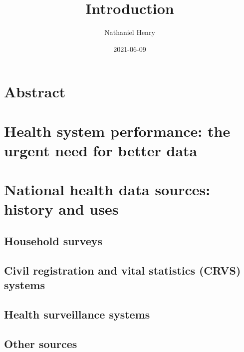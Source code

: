 \documentclass[
]{article}
\title{Introduction}
\author{Nathaniel Henry}
\date{2021-06-09}
\begin{document}
\maketitle

\hypertarget{abstract}{%
\section{Abstract}\label{abstract}}

\lipsum[1]

\hypertarget{health-system-performance-the-urgent-need-for-better-data}{%
\section{Health system performance: the urgent need for better data}\label{health-system-performance-the-urgent-need-for-better-data}}

\lipsum[2-6]

\hypertarget{national-health-data-sources-history-and-uses}{%
\section{National health data sources: history and uses}\label{national-health-data-sources-history-and-uses}}

\lipsum[7-10]

\hypertarget{household-surveys}{%
\subsection{Household surveys}\label{household-surveys}}

\lipsum[11-15]

\hypertarget{civil-registration-and-vital-statistics-crvs-systems}{%
\subsection{Civil registration and vital statistics (CRVS) systems}\label{civil-registration-and-vital-statistics-crvs-systems}}

\lipsum[1-5]

\hypertarget{health-surveillance-systems}{%
\subsection{Health surveillance systems}\label{health-surveillance-systems}}

\lipsum[6-10]

\hypertarget{other-sources}{%
\subsection{Other sources}\label{other-sources}}
\end{document}
